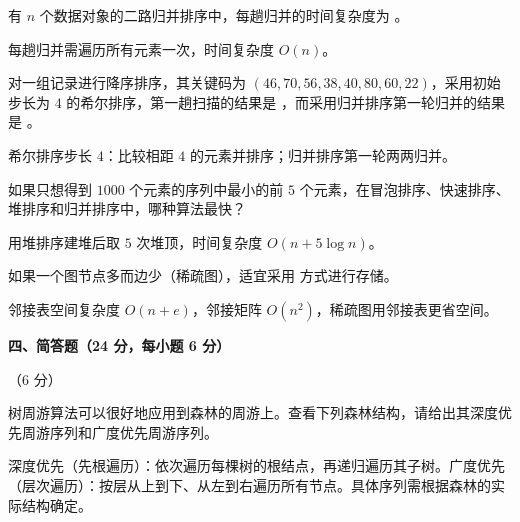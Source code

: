 \begin{question}
有 $n$ 个数据对象的二路归并排序中，每趟归并的时间复杂度为 \underline{\hspace{4em}}。
\begin{solution}
每趟归并需遍历所有元素一次，时间复杂度 $O(n)$。
\end{solution}
\end{question}

\begin{question}
对一组记录进行降序排序，其关键码为 $(46,70,56,38,40,80,60,22)$，采用初始步长为 $4$ 的希尔排序，第一趟扫描的结果是 \underline{\hspace{4em}}，而采用归并排序第一轮归并的结果是 \underline{\hspace{4em}}。
\begin{solution}
希尔排序步长 $4$：比较相距 $4$ 的元素并排序；归并排序第一轮两两归并。
\end{solution}
\end{question}

\begin{question}
如果只想得到 $1000$ 个元素的序列中最小的前 $5$ 个元素，在冒泡排序、快速排序、堆排序和归并排序中，哪种算法最快？\underline{\hspace{4em}}
\begin{solution}
用堆排序建堆后取 $5$ 次堆顶，时间复杂度 $O(n+5\log n)$。
\end{solution}
\end{question}

\begin{question}
如果一个图节点多而边少（稀疏图），适宜采用 \underline{\hspace{4em}} 方式进行存储。
\begin{solution}
邻接表空间复杂度 $O(n+e)$，邻接矩阵 $O(n^2)$，稀疏图用邻接表更省空间。
\end{solution}
\end{question}

\clearpage

\textbf{四、简答题（24 分，每小题 6 分）}

\begin{question}[森林周游]（6 分）

树周游算法可以很好地应用到森林的周游上。查看下列森林结构，请给出其深度优先周游序列和广度优先周游序列。

\begin{solution}
深度优先（先根遍历）：依次遍历每棵树的根结点，再递归遍历其子树。广度优先（层次遍历）：按层从上到下、从左到右遍历所有节点。具体序列需根据森林的实际结构确定。
\end{solution}
\end{question}

